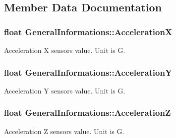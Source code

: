 \subsection{Member Data Documentation}
\subsubsection[{\texorpdfstring{AccelerationX}{AccelerationX}}]{\setlength{\rightskip}{0pt plus 5cm}float General\+Informations\+::\+AccelerationX}\hypertarget{struct_general_informations_a3efc018f27ed117ab22e0058503b5105}{}\label{struct_general_informations_a3efc018f27ed117ab22e0058503b5105}


Acceleration X sensor\textquotesingle{}s value. Unit is G. 

\subsubsection[{\texorpdfstring{AccelerationY}{AccelerationY}}]{\setlength{\rightskip}{0pt plus 5cm}float General\+Informations\+::\+AccelerationY}\hypertarget{struct_general_informations_a2119e215e49f8bafe8cb5b9ddf8c58b5}{}\label{struct_general_informations_a2119e215e49f8bafe8cb5b9ddf8c58b5}


Acceleration Y sensor\textquotesingle{}s value. Unit is G. 

\subsubsection[{\texorpdfstring{AccelerationZ}{AccelerationZ}}]{\setlength{\rightskip}{0pt plus 5cm}float General\+Informations\+::\+AccelerationZ}\hypertarget{struct_general_informations_a2a22c6b9b88f19a650137a1e6df8d571}{}\label{struct_general_informations_a2a22c6b9b88f19a650137a1e6df8d571}


Acceleration Z sensor\textquotesingle{}s value. Unit is G. 

